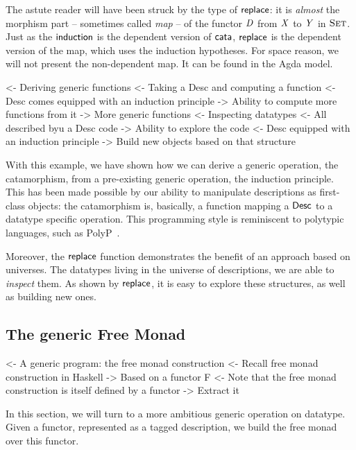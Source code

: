 The astute reader will have been struck by the type of $\F{replace}$:
it is \emph{almost} the morphism part -- sometimes called \emph{map}
-- of the functor $\V{D}$ from $\V{X}$ to $\V{Y}$ in $\Set$. Just as
the $\F{induction}$ is the dependent version of $\cata$, $\F{replace}$
is the dependent version of the map, which uses the induction
hypotheses. For space reason, we will not present the non-dependent
map. It can be found in the Agda model.

\begin{wstructure}
<- Deriving generic functions
    <- Taking a Desc and computing a function
        <- Desc comes equipped with an induction principle
        -> Ability to compute more functions from it
            -> More generic functions
    <- Inspecting datatypes
        <- All described byu a Desc code
        -> Ability to explore the code
            <- Desc equipped with an induction principle
            -> Build new objects based on that structure
\end{wstructure}

With this example, we have shown how we can derive a generic
operation, the catamorphism, from a pre-existing generic operation,
the induction principle. This has been made possible by our ability to
manipulate descriptions as first-class objects: the catamorphism is,
basically, a function mapping a $\Desc$ to a datatype specific
operation. This programming style is reminiscent to polytypic
languages, such as PolyP~\cite{jansson:polyp}.

Moreover, the $\F{replace}$ function demonstrates the benefit of an
approach based on universes. The datatypes living in the universe of
descriptions, we are able to \emph{inspect} them. As shown by
$\F{replace}$, it is easy to explore these structures, as well as
building new ones.

\subsection{The generic Free Monad}
\label{sec:desc-free-monad}

\begin{wstructure}
<- A generic program: the free monad construction
    <- Recall free monad construction in Haskell
        -> Based on a functor F
    <- Note that the free monad construction is itself defined by a functor
        -> Extract it
\end{wstructure}

In this section, we will turn to a more ambitious generic operation on
datatype. Given a functor, represented as a tagged description, we
build the free monad over this functor.

